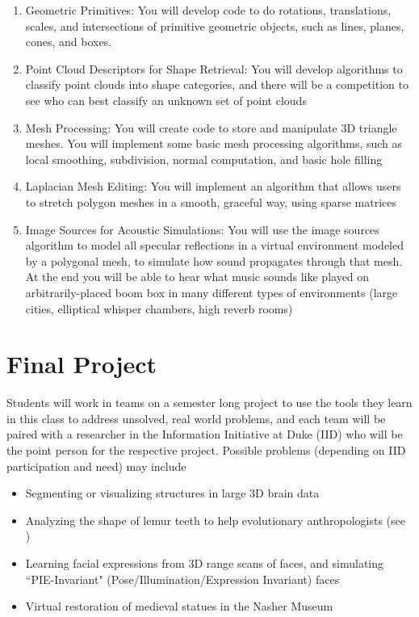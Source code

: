 \documentclass{article}
\begin{document}
\begin{enumerate}
\item {\Large Geometric Primitives}: \normalsize You will develop code to do rotations, translations, scales, and intersections of primitive geometric objects, such as lines, planes, cones, and boxes.

\item {\Large Point Cloud Descriptors for Shape Retrieval}: \normalsize You will develop algorithms to classify point clouds into shape categories, and there will be a competition to see who can best classify an unknown set of point clouds

\item {\Large Mesh Processing}: \normalsize You will create code to store and manipulate 3D triangle meshes.  You will implement some basic mesh processing algorithms, such as local smoothing, subdivision, normal computation, and basic hole filling

\item {\Large Laplacian Mesh Editing}: \normalsize You will implement an algorithm that allows users to stretch polygon meshes in a smooth, graceful way, using sparse matrices

\item {\Large Image Sources for Acoustic Simulations}: \normalsize You will use the image sources algorithm to model all specular reflections in a virtual environment modeled by a polygonal mesh, to simulate how sound propagates through that mesh.  At the end you will be able to hear what music sounds like played on arbitrarily-placed boom box in many different types of environments (large cities, elliptical whisper chambers, high reverb rooms)

\end{enumerate} 


\section{Final Project}
Students will work in teams on a semester long project to use the tools they learn in this class to address unsolved, real world problems, and each team will be paired with a researcher in the Information Initiative at Duke (IID) who will be the point person for the respective project.  Possible problems (depending on IID participation and need) may include

\begin{itemize}

\item Segmenting or visualizing structures in large 3D brain data

\item Analyzing the shape of lemur teeth to help evolutionary anthropologists (see \cite{boyer2011algorithms})

\item Learning facial expressions from 3D range scans of faces, and simulating ``PIE-Invariant" (Pose/Illumination/Expression Invariant) faces

\item Virtual restoration of medieval statues in the Nasher Museum

\end{itemize}
\end{document}
